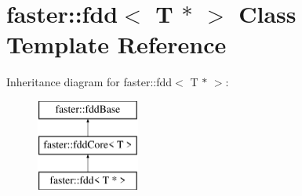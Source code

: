 \hypertarget{classfaster_1_1fdd_3_01T_01_5_01_4}{}\section{faster\+:\+:fdd$<$ T $\ast$ $>$ Class Template Reference}
\label{classfaster_1_1fdd_3_01T_01_5_01_4}
Inheritance diagram for faster\+:\+:fdd$<$ T $\ast$ $>$\+:\begin{figure}[H]
\begin{center}
\leavevmode
\includegraphics[height=3.000000cm]{classfaster_1_1fdd_3_01T_01_5_01_4}
\end{center}
\end{figure}
